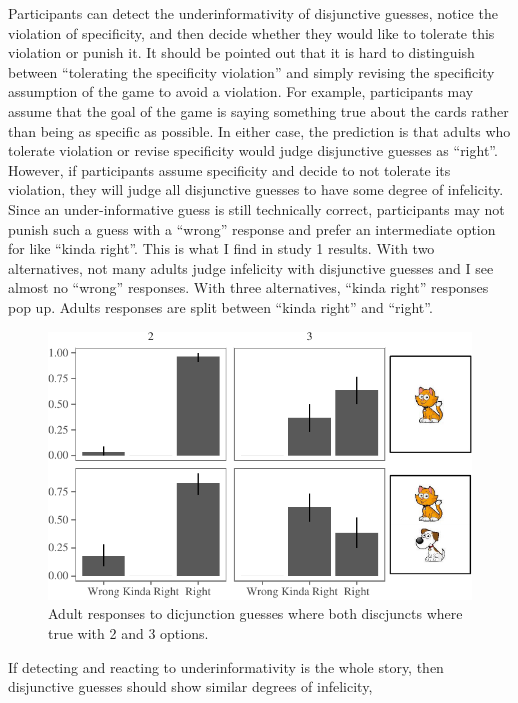 \documentclass[oneside]{report}
\theoremstyle{definition}
\theoremstyle{definition}
\theoremstyle{definition}
\theoremstyle{remark}
\begin{document}
Participants can detect the underinformativity of disjunctive guesses,
notice the violation of specificity, and then decide whether they would
like to tolerate this violation or punish it. It should be pointed out
that it is hard to distinguish between ``tolerating the specificity
violation'' and simply revising the specificity assumption of the game
to avoid a violation. For example, participants may assume that the goal
of the game is saying something true about the cards rather than being
as specific as possible. In either case, the prediction is that adults
who tolerate violation or revise specificity would judge disjunctive
guesses as ``right''. However, if participants assume specificity and
decide to not tolerate its violation, they will judge all disjunctive
guesses to have some degree of infelicity. Since an under-informative
guess is still technically correct, participants may not punish such a
guess with a ``wrong'' response and prefer an intermediate option for
like ``kinda right''. This is what I find in study 1 results. With two
alternatives, not many adults judge infelicity with disjunctive guesses
and I see almost no ``wrong'' responses. With three alternatives,
``kinda right'' responses pop up. Adults responses are split between
``kinda right'' and ``right''.
\begin{figure}[tb]

{\centering \includegraphics{figs/implicaturePlot-1} 

}

\caption{Adult responses to dicjunction guesses where both discjuncts where true with 2 and 3 options.}\label{fig:implicaturePlot}
\end{figure}
If detecting and reacting to underinformativity is the whole story, then
disjunctive guesses should show similar degrees of infelicity,
\end{document}
